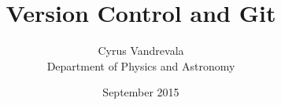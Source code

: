 



\title{Version Control and Git}
\subtitle{}
\author{Cyrus Vandrevala\\Department of Physics and Astronomy}
\date{September 2015}
















